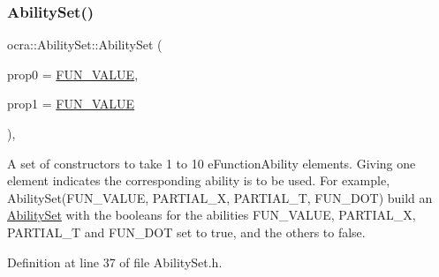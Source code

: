 \subsubsection{\texorpdfstring{Ability\+Set()}{AbilitySet()}\hspace{0.1cm}{\footnotesize\ttfamily [2/4]}}
{\footnotesize\ttfamily ocra\+::\+Ability\+Set\+::\+Ability\+Set (\begin{DoxyParamCaption}\item[{\hyperlink{namespaceocra_a40ddbec106a6034cd2047bba9945b568}{e\+Function\+Ability}}]{prop0 = {\ttfamily \hyperlink{namespaceocra_a40ddbec106a6034cd2047bba9945b568acfb47b20329993093d2022b017239bd8}{F\+U\+N\+\_\+\+V\+A\+L\+UE}},  }\item[{\hyperlink{namespaceocra_a40ddbec106a6034cd2047bba9945b568}{e\+Function\+Ability}}]{prop1 = {\ttfamily \hyperlink{namespaceocra_a40ddbec106a6034cd2047bba9945b568acfb47b20329993093d2022b017239bd8}{F\+U\+N\+\_\+\+V\+A\+L\+UE}} }\end{DoxyParamCaption})\hspace{0.3cm}{\ttfamily [inline]}, {\ttfamily [protected]}}

A set of constructors to take 1 to 10 e\+Function\+Ability elements. Giving one element indicates the corresponding ability is to be used. For example, Ability\+Set(\+F\+U\+N\+\_\+\+V\+A\+L\+U\+E, P\+A\+R\+T\+I\+A\+L\+\_\+\+X, P\+A\+R\+T\+I\+A\+L\+\_\+\+T, F\+U\+N\+\_\+\+D\+O\+T) build an \hyperlink{classocra_1_1AbilitySet}{Ability\+Set} with the booleans for the abilities F\+U\+N\+\_\+\+V\+A\+L\+UE, P\+A\+R\+T\+I\+A\+L\+\_\+X, P\+A\+R\+T\+I\+A\+L\+\_\+T and F\+U\+N\+\_\+\+D\+OT set to true, and the others to false. 

Definition at line 37 of file Ability\+Set.\+h.

\hypertarget{classocra_1_1AbilitySet_a7ac0f7bd650b04cef83728ea1d121015}{}\label{classocra_1_1AbilitySet_a7ac0f7bd650b04cef83728ea1d121015} 
